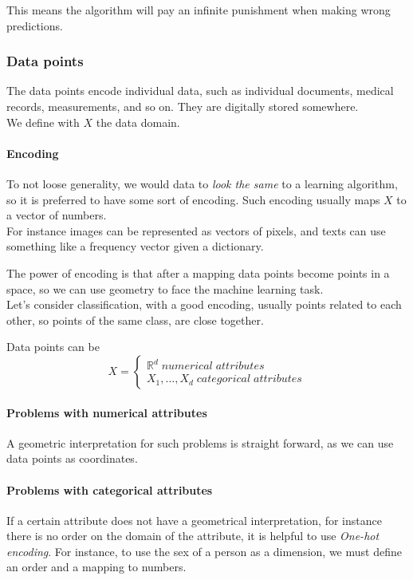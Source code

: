 This means the algorithm will pay an infinite punishment when making wrong predictions.

\subsubsection{Data points}
The data points encode individual data, such as individual documents, medical records, 
measurements, and so on. They are digitally stored somewhere.\\
We define with $X$ the data domain.

\paragraph{Encoding}
To not loose generality, we would data to \emph{look the same} to a learning algorithm, 
so it is preferred to have some sort of encoding. Such encoding usually maps $X$ to a 
vector of numbers.\\
For instance images can be represented as vectors of pixels, and texts can use 
something like a frequency vector given a dictionary.

The power of encoding is that after a mapping data points become points in a space, 
so we can use geometry to face the machine learning task.\\
Let's consider classification, with a good encoding, usually points related to each 
other, so points of the same class, are close together.

Data points can be
\[
    X = \begin{cases}
        \mathbb{R}^d\;\mathit{numerical\;attributes}\\
        X_1, \dots, X_d\; \mathit{categorical\;attributes}
    \end{cases}\]

\paragraph{Problems with numerical attributes}
A geometric interpretation for such problems is straight forward, as we can use data
points as coordinates.

\paragraph{Problems with categorical attributes}
If a certain attribute does not have a geometrical interpretation, for instance there is 
no order on the domain of the attribute, it is helpful to use \emph{One-hot encoding}.
For instance, to use the sex of a person as a dimension, we must define an order and a mapping
to numbers.

